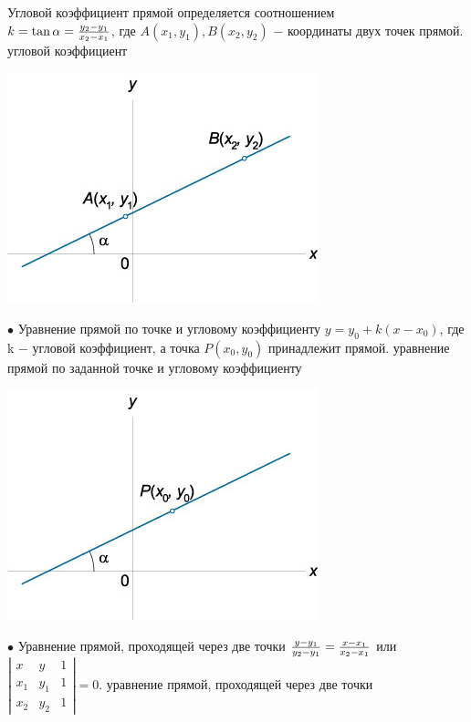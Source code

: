 \documentclass[oneside]{book}
\begin{document}
\begin{enumerate}
\begin{itemize}
\begin{enumerate}
Угловой коэффициент прямой определяется соотношением \\
$k = \tan \alpha = \large\frac{{{y_2} - {y_1}}}{{{x_2} - {x_1}}}\normalsize$,
где $A\left( {{x_1},{y_1}} \right), B\left( {{x_2},{y_2}} \right)$ − координаты двух точек прямой.
угловой коэффициент

\begin{center}
\includegraphics[scale=0.4]{./pics/4.jpg}
\end{center}

$\bullet$  Уравнение прямой по точке и угловому коэффициенту
$y = {y_0} + k\left( {x - {x_0}} \right)$,
где k − угловой коэффициент, а точка $P\left( {{x_0},{y_0}} \right)$ принадлежит прямой.
уравнение прямой по заданной точке и угловому коэффициенту

\begin{center}
\includegraphics[scale=0.4]{./pics/5.jpg}
\end{center}

$\bullet$ Уравнение прямой, проходящей через две точки  
$\large\frac{{y - {y_1}}}{{{y_2} - {y_1}}}\normalsize = \large\frac{{x - {x_1}}}{{{x_2} - {x_1}}}\normalsize$  или $ \left| {\begin{array}{*{20}{c}} x & y & 1\\ {{x_1}} & {{y_1}} & 1\\ {{x_2}} & {{y_2}} & 1 \end{array}} \right| = 0$.
уравнение прямой, проходящей через две точки


\end{enumerate}
\end{itemize}
\end{enumerate}
\end{document}
